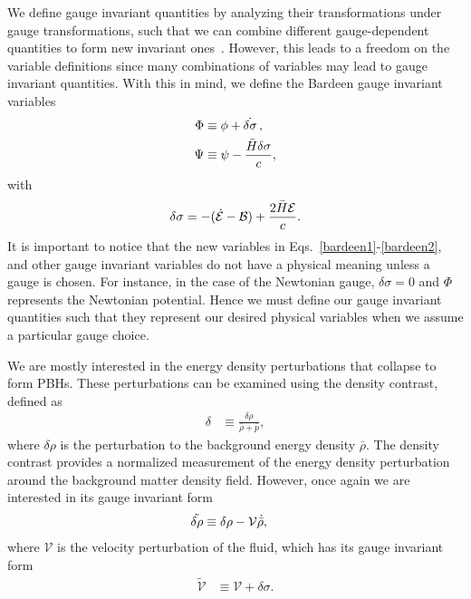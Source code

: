 \documentclass[a4paper,11pt]{article}
\begin{document}
We define gauge invariant quantities by analyzing their transformations under gauge transformations, such that we can combine different gauge-dependent quantities to form new invariant ones~\cite{covariant_bardeen}. However, this leads to a freedom on the variable definitions since many combinations of variables may lead to gauge invariant quantities. With this in mind, we define the Bardeen gauge invariant variables~\cite{Bardeen1980}
\begin{align}
\label{bardeen1}
    \Phi &\equiv \phi + \dot{\delta \sigma}\, , \\
\label{bardeen2}
    \Psi &\equiv \psi - \frac{\Bar{H}\delta \sigma}{c}
,\end{align}
with
\begin{align}
    \delta\sigma = -(\dot{\mathcal{E}} - \mathcal{B}) + \frac{2 \Bar{H}\mathcal{E}}{c}
.\end{align}
It is important to notice that the new variables in Eqs.~\eqref{bardeen1}-\eqref{bardeen2}, and other gauge invariant variables do not have a physical meaning unless a gauge is chosen. For instance, in the case of the Newtonian gauge, $\delta\sigma =0$ and $\Phi$ represents the Newtonian potential.
Hence we must define our gauge invariant quantities such that they represent our desired physical variables when we assume a particular gauge choice.

We are mostly interested in the energy density perturbations that collapse to form PBHs. These perturbations can be examined using the density contrast, defined as
\begin{align}
	\label{densitycon}
	\delta &\equiv \frac{\delta \rho}{\bar{\rho} + \bar{p}}
,\end{align}
where $\delta\rho$ is the perturbation to the background energy density $\bar\rho$. The density contrast provides a normalized measurement of the energy density perturbation around the background matter density field. However, once again we are interested in its gauge invariant form
\begin{align}
\label{deltarhoinvariant}
    \tilde{\delta\rho} &\equiv \delta\rho - \mathcal{V} \dot{\Bar{\rho}}
,\end{align}
where $\mathcal{V}$ is the velocity perturbation of the fluid, which has its gauge invariant form
\begin{align}
    \tilde{\mathcal{V}} &\equiv \mathcal{V} + \delta\sigma
.\end{align}
\end{document}
